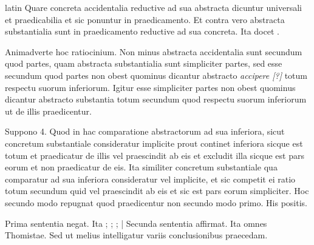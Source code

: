 \begin{otherlanguage*}{latin}
\pstart
Quare concreta accidentalia reductive ad sua abstracta dicuntur universali et praedicabilia et sic ponuntur in praedicamento. Et contra vero abstracta substantialia sunt in praedicamento reductive ad sua concreta. Ita docet . 
\pend

\pstart
Animadverte hoc ratiocinium. Non minus abstracta accidentalia sunt secundum quod partes, quam abstracta substantialia sunt simpliciter partes, sed esse secundum quod partes non obest quominus dicantur abstracto \emph{accipere [?]} totum respectu suorum inferiorum. Igitur esse simpliciter partes non obest quominus dicantur abstracto substantia totum secundum quod respectu suorum inferiorum ut de illis praedicentur. 
\pend

\pstart
Suppono 4. Quod in hac comparatione abstractorum ad sua inferiora, sicut concretum substantiale consideratur implicite prout continet inferiora sicque est totum et praedicatur de illis vel praescindit ab eis et excludit illa sicque est pars eorum et non praedicatur de eis. Ita similiter concretum substantiale qua comparatur ad sua inferiora consideratur vel implicite, et sic competit ei ratio totum secundum quid vel praescindit ab eis et sic est pars eorum simpliciter. Hoc secundo modo repugnat quod praedicentur non secundo modo primo. His positis. 
\pend

\pstart
Prima sententia negat. Ita ; ; ;  \textnormal{|} Secunda sententia affirmat. Ita omnes Thomistae. Sed ut melius intelligatur variis conclusionibus praecedam. 
\pend


\end{otherlanguage*}
